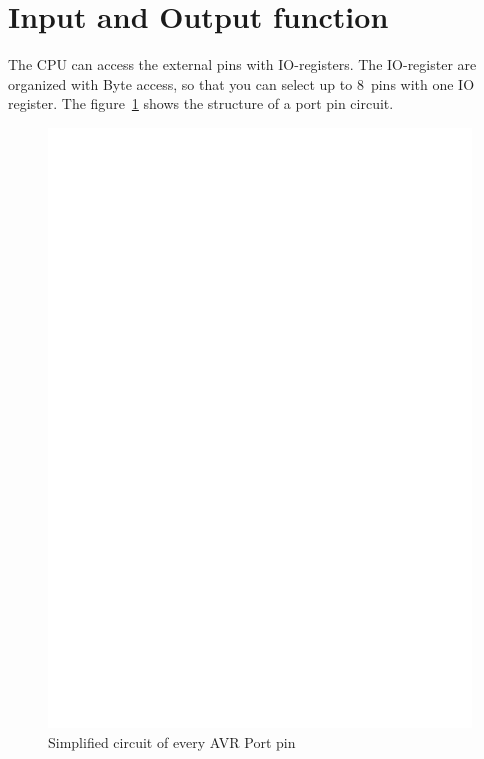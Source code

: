 \section{Input and Output function}

The CPU can access the external pins with IO-registers.
The IO-register are organized with Byte access, so that you
can select up to 8~pins with one IO register.
The figure~\ref{fig:port} shows the structure of a port pin circuit.

\begin{figure}[H]
\centering
\includegraphics[]{../FIG/port.eps}
\caption{Simplified circuit of every AVR Port pin}
\label{fig:port}
\end{figure}

